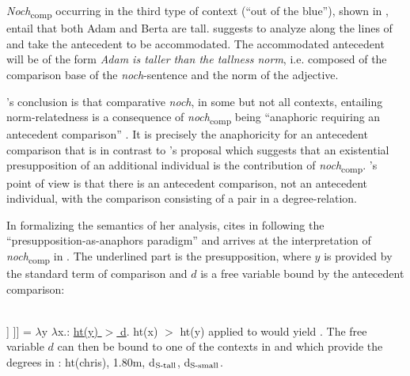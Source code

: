 \documentclass[output=paper]{langsci/langscibook}
\begin{document}
\textit{Noch}\textsubscript{comp} occurring in the third type of context (``out of the blue''), shown in , entail that both Adam and Berta are tall. \citeauthor{umbach2009a_comp} suggests to analyze  along the lines of  and take the antecedent to be accommodated. The accommodated antecedent will be of the form \textit{Adam is taller than the tallness norm}, i.e. composed of the comparison base of the \textit{noch}-sentence and the norm of the adjective.

\citeauthor{umbach2009a_comp}'s \citeyearpar{umbach2009a_comp} conclusion is that comparative \textit{noch}, in some but not all contexts, entailing norm-relatedness is a consequence of \textit{noch}\textsubscript{comp} being ``anaphoric requiring an antecedent comparison'' \citep[10]{umbach2009a_comp}. It is precisely the anaphoricity for an antecedent comparison that is in contrast to \citeauthor{koenig1977}'s \citeyearpar{koenig1977} proposal which suggests that an existential presupposition of an additional individual is the contribution of \textit{noch}\textsubscript{comp}. \citeauthor{umbach2009a_comp}'s \citeyearpar{umbach2009a_comp} point of view is that there is an antecedent comparison, not an antecedent individual, with the comparison consisting of a pair in a degree-relation.

In formalizing the semantics of her analysis, \citeauthor{umbach2009a_comp} cites \citet{van_der_sandt_1992} in following the ``presupposition-as-anaphors paradigm'' \citep[11]{umbach2009a_comp} and arrives at the interpretation of \textit{noch}\textsubscript{comp} in . The underlined part is the presupposition, where $y$ is provided by the standard term of comparison and $d$ is a free variable bound by the antecedent comparison:

\ea \citep[ex. 24, emphasis in the original]{umbach2009a_comp}\\\relax [[ [$_{\textnormal{\footnotesize{AP}}}$ \textit{noch} [$_{\textnormal{\footnotesize{AP}}}$ \textit{größer} ]] ]] = $\lambda$y $\lambda$x.: \uline{ht(y) $>$ d}. ht(x) $>$ ht(y) \label{umbach's_meaning_of_noch}
\z
{} applied to  would yield . The free variable $d$ can then be bound to one of the contexts in  and  which provide the degrees in : ht(chris), 1.80m, d$_{\textnormal{\scriptsize{S-tall}}}$, d$_{\textnormal{\scriptsize{S-small}}}$.
\end{document}
